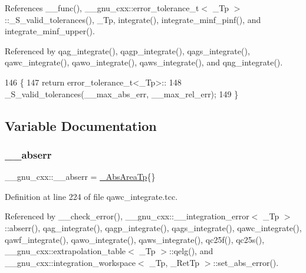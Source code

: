 References \+\_\+\+\_\+func(), \+\_\+\+\_\+gnu\+\_\+cxx\+::error\+\_\+tolerance\+\_\+t$<$ \+\_\+\+Tp $>$\+::\+\_\+\+S\+\_\+valid\+\_\+tolerances(), \+\_\+\+Tp, integrate(), integrate\+\_\+minf\+\_\+pinf(), and integrate\+\_\+minf\+\_\+upper().



Referenced by qag\+\_\+integrate(), qagp\+\_\+integrate(), qags\+\_\+integrate(), qawc\+\_\+integrate(), qawo\+\_\+integrate(), qaws\+\_\+integrate(), and qng\+\_\+integrate().


\begin{DoxyCode}
146     \{
147       \textcolor{keywordflow}{return} error\_tolerance\_t<\_Tp>::
148              \_S\_valid\_tolerances(\_\_max\_abs\_err, \_\_max\_rel\_err);
149     \}
\end{DoxyCode}


\subsection{Variable Documentation}
\mbox{\label{namespace____gnu__cxx_a72f736cff127f1574e91a301de9e074b}} 
\subsubsection{\texorpdfstring{\+\_\+\+\_\+abserr}{\_\_abserr}}
{\footnotesize\ttfamily \+\_\+\+\_\+gnu\+\_\+cxx\+::\+\_\+\+\_\+abserr = \hyperlink{namespace____gnu__cxx_a2f005089fd7e29a63d4165c56a5f4235}{\+\_\+\+Abs\+Area\+Tp}\{\}}



Definition at line 224 of file qawc\+\_\+integrate.\+tcc.



Referenced by \+\_\+\+\_\+check\+\_\+error(), \+\_\+\+\_\+gnu\+\_\+cxx\+::\+\_\+\+\_\+integration\+\_\+error$<$ \+\_\+\+Tp $>$\+::abserr(), qag\+\_\+integrate(), qagp\+\_\+integrate(), qags\+\_\+integrate(), qawc\+\_\+integrate(), qawf\+\_\+integrate(), qawo\+\_\+integrate(), qaws\+\_\+integrate(), qc25f(), qc25s(), \+\_\+\+\_\+gnu\+\_\+cxx\+::extrapolation\+\_\+table$<$ \+\_\+\+Tp $>$\+::qelg(), and \+\_\+\+\_\+gnu\+\_\+cxx\+::integration\+\_\+workspace$<$ \+\_\+\+Tp, \+\_\+\+Ret\+Tp $>$\+::set\+\_\+abs\+\_\+error().

\mbox{\label{namespace____gnu__cxx_a7994ff975ddada084e4a738578302940}} 

